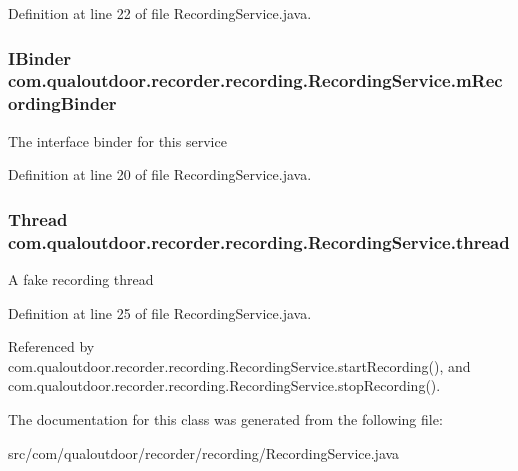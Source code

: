 Definition at line 22 of file Recording\-Service.\-java.

\hypertarget{classcom_1_1qualoutdoor_1_1recorder_1_1recording_1_1RecordingService_ac19023b61b61f80ce69723f5ac3e78f7}{
\subsubsection[{m\-Recording\-Binder}]{\setlength{\rightskip}{0pt plus 5cm}I\-Binder com.\-qualoutdoor.\-recorder.\-recording.\-Recording\-Service.\-m\-Recording\-Binder\hspace{0.3cm}{\ttfamily [private]}}}\label{classcom_1_1qualoutdoor_1_1recorder_1_1recording_1_1RecordingService_ac19023b61b61f80ce69723f5ac3e78f7}
The interface binder for this service 

Definition at line 20 of file Recording\-Service.\-java.

\hypertarget{classcom_1_1qualoutdoor_1_1recorder_1_1recording_1_1RecordingService_a17aeabbe9a9d27439c297bbf1ff4d3eb}{
\subsubsection[{thread}]{\setlength{\rightskip}{0pt plus 5cm}Thread com.\-qualoutdoor.\-recorder.\-recording.\-Recording\-Service.\-thread\hspace{0.3cm}{\ttfamily [private]}}}\label{classcom_1_1qualoutdoor_1_1recorder_1_1recording_1_1RecordingService_a17aeabbe9a9d27439c297bbf1ff4d3eb}
A fake recording thread 

Definition at line 25 of file Recording\-Service.\-java.



Referenced by com.\-qualoutdoor.\-recorder.\-recording.\-Recording\-Service.\-start\-Recording(), and com.\-qualoutdoor.\-recorder.\-recording.\-Recording\-Service.\-stop\-Recording().



The documentation for this class was generated from the following file\-:\begin{DoxyCompactItemize}
\item 
src/com/qualoutdoor/recorder/recording/Recording\-Service.\-java\end{DoxyCompactItemize}
